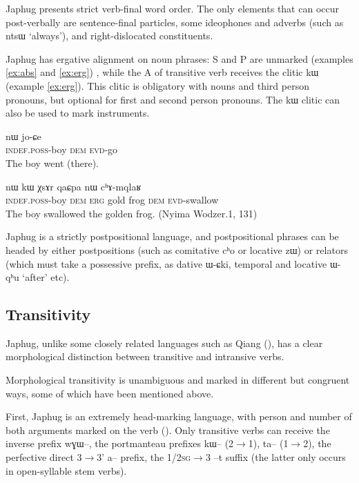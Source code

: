 \documentclass[oldfontcommands,oneside,a4paper,11pt]{article}
\newcommand{\ipa}[1]{{\phon #1}} %
\begin{document}
Japhug presents strict verb-final word order. The only elements that can occur post-verbally are sentence-final particles, some ideophones and adverbs (such as \ipa{ntsɯ} `always'), and right-dislocated constituents.

Japhug has ergative alignment on noun phrases:  S and P are unmarked (examples \ref{ex:abs} and \ref{ex:erg}) , while the A of transitive verb receives the clitic \ipa{kɯ} (example \ref{ex:erg}). This clitic is obligatory with nouns and third person pronouns, but optional for first and second person pronouns. The \ipa{kɯ} clitic can also be used to mark instruments.

\begin{exe}
\ex \label{ex:abs}
\gll \ipa{tɤ-tɕɯ}  	\ipa{nɯ}  	 	\ipa{jo-ɕe}   \\
\textsc{indef.poss}-boy \textsc{dem}   \textsc{evd}-go \\
\glt The boy went (there).
\end{exe}

\begin{exe}
\ex \label{ex:erg}
\gll \ipa{tɤ-tɕɯ}  	\ipa{nɯ}  	\ipa{kɯ}  	\ipa{χsɤr}  	\ipa{qaɕpa}  	\ipa{nɯ}  	\ipa{cʰɤ-mqlaʁ}   \\
\textsc{indef.poss}-boy \textsc{dem} \textsc{erg} gold frog \textsc{dem} \textsc{evd}-swallow \\
\glt The boy swallowed the golden frog. (Nyima Wodzer.1, 131)
\end{exe}


Japhug is a strictly postpositional language, and postpositional phrases can be headed by either postpositions (such as comitative \ipa{cʰo} or locative \ipa{zɯ}) or relators (which must take a possessive prefix, as dative \ipa{ɯ-ɕki}, temporal and locative  \ipa{ɯ-qʰu} `after' etc).

 

\subsection{Transitivity} \label{sec:trans}

Japhug, unlike some closely related languages such as Qiang (\citealt{lapolla11transitivity}), has a clear morphological distinction between transitive and intransive verbs. 

  Morphological transitivity is unambiguous and  marked in   different but congruent  ways, some of which have been mentioned above.

First,  Japhug  is an extremely head-marking language, with person and number of both arguments marked on the verb (\citealt{jacques10inverse}). Only transitive verbs can receive the inverse prefix \ipa{wɣɯ}--, the portmanteau prefixes \ipa{kɯ}-- (2$\rightarrow$1), \ipa{ta}-- (1$\rightarrow$2), the perfective direct 3$\rightarrow$3'  \ipa{a}-- prefix,  the 1/\textsc{2sg}$\rightarrow$3 --\ipa{t} suffix (the latter only occurs in open-syllable stem verbs).
\end{document}
